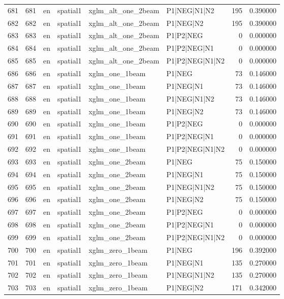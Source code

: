 \begin{tabular}{lrllllrr}
681 & 681 & en & spatial1 & xglm_alt_one_2beam & P1|NEG|N1|N2 & 195 & 0.390000 \\
682 & 682 & en & spatial1 & xglm_alt_one_2beam & P1|NEG|N2 & 195 & 0.390000 \\
683 & 683 & en & spatial1 & xglm_alt_one_2beam & P1|P2|NEG & 0 & 0.000000 \\
684 & 684 & en & spatial1 & xglm_alt_one_2beam & P1|P2|NEG|N1 & 0 & 0.000000 \\
685 & 685 & en & spatial1 & xglm_alt_one_2beam & P1|P2|NEG|N1|N2 & 0 & 0.000000 \\
686 & 686 & en & spatial1 & xglm_one_1beam & P1|NEG & 73 & 0.146000 \\
687 & 687 & en & spatial1 & xglm_one_1beam & P1|NEG|N1 & 73 & 0.146000 \\
688 & 688 & en & spatial1 & xglm_one_1beam & P1|NEG|N1|N2 & 73 & 0.146000 \\
689 & 689 & en & spatial1 & xglm_one_1beam & P1|NEG|N2 & 73 & 0.146000 \\
690 & 690 & en & spatial1 & xglm_one_1beam & P1|P2|NEG & 0 & 0.000000 \\
691 & 691 & en & spatial1 & xglm_one_1beam & P1|P2|NEG|N1 & 0 & 0.000000 \\
692 & 692 & en & spatial1 & xglm_one_1beam & P1|P2|NEG|N1|N2 & 0 & 0.000000 \\
693 & 693 & en & spatial1 & xglm_one_2beam & P1|NEG & 75 & 0.150000 \\
694 & 694 & en & spatial1 & xglm_one_2beam & P1|NEG|N1 & 75 & 0.150000 \\
695 & 695 & en & spatial1 & xglm_one_2beam & P1|NEG|N1|N2 & 75 & 0.150000 \\
696 & 696 & en & spatial1 & xglm_one_2beam & P1|NEG|N2 & 75 & 0.150000 \\
697 & 697 & en & spatial1 & xglm_one_2beam & P1|P2|NEG & 0 & 0.000000 \\
698 & 698 & en & spatial1 & xglm_one_2beam & P1|P2|NEG|N1 & 0 & 0.000000 \\
699 & 699 & en & spatial1 & xglm_one_2beam & P1|P2|NEG|N1|N2 & 0 & 0.000000 \\
700 & 700 & en & spatial1 & xglm_zero_1beam & P1|NEG & 196 & 0.392000 \\
701 & 701 & en & spatial1 & xglm_zero_1beam & P1|NEG|N1 & 135 & 0.270000 \\
702 & 702 & en & spatial1 & xglm_zero_1beam & P1|NEG|N1|N2 & 135 & 0.270000 \\
703 & 703 & en & spatial1 & xglm_zero_1beam & P1|NEG|N2 & 171 & 0.342000 \\

\end{tabular}
